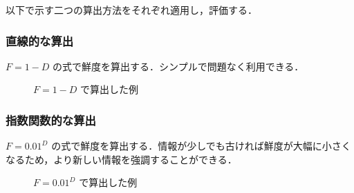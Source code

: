 以下で示す二つの算出方法をそれぞれ適用し，評価する．

\subsubsection{直線的な算出}

$ F = 1 - D $ の式で鮮度を算出する．シンプルで問題なく利用できる．

\begin{figure}[htbp]
  \begin{center}
  \end{center}
  \caption{$ F = 1 - D $ で算出した例}
\end{figure}

\subsubsection{指数関数的な算出}

$ F =  0.01 ^ D $ の式で鮮度を算出する．情報が少しでも古ければ鮮度が大幅に小さくなるため，より新しい情報を強調することができる．

\begin{figure}[htbp]
  \begin{center}
  \end{center}
  \caption{$ F =  0.01 ^ D $ で算出した例}
\end{figure}

